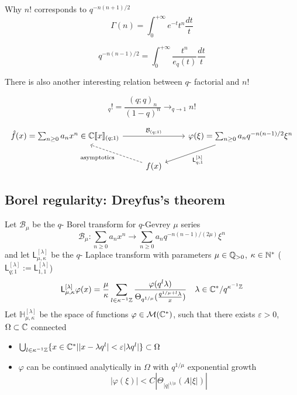 \documentclass[11pt,a4paper,twoside,leqno,noamsfonts]{amsart}
\numberwithin{equation}{section}
\begin{document}
\begin{remark} Why $n!$ corresponds to $q^{-n(n+1)/2}$
\begin{equation}
\Gamma(n)=\int_0^{+\infty}e^{-t}t^n\frac{dt}{t}
\end{equation}

\begin{equation}
q^{-n(n-1)/2}=\int_0^{+\infty}\frac{t^n}{e_q(t)}\frac{dt}{t}
\end{equation}
\end{remark}

There is also another interesting relation between $q$- factorial and $n!$

\begin{equation}
[n]_q!= \frac{(q;q)_n}{(1-q)^n} \rightarrow_{q\to 1} n!
\end{equation}

\[
\begin{tikzcd}
\hat{f}(x)=\sum_{n\geq 0}a_n x^n\in\mathbb{C}[\![x]\!]_{(q;1)} \arrow[rr,"\mathcal{B}_{(q;1)}"] & & \varphi(\xi)=\sum_{n\geq 0}a_n q^{-n(n-1)/2}\xi^n\arrow[dl,"\mathsf{L}^{[\lambda]}_{q;1}"]\\
&f(x)\arrow[lu,dashed ,"\text{asymptotics}"] &
\end{tikzcd}
\]

\subsection{Borel regularity: Dreyfus's theorem}

Let $\mathcal{B}_{\mu}$ be the $q$- Borel transform for $q$-Gevrey $\mu$ series
\begin{equation}
    \mathcal{B}_{\mu}\colon\sum_{n\geq 0}a_nx^n\to \sum_{n\geq 0}a_n q^{-n(n-1)/(2\mu)}\xi^n
\end{equation}
and let $\mathsf{L}_{\mu,\kappa}^{[\lambda]}$ be the $q$- Laplace transform with parameters $\mu\in\mathbb Q_{>0}$, $\kappa\in\mathbb N^*$ ($\mathsf{L}_{q;1}^{[\lambda]}:=\mathsf{L}_{1,1}^{[\lambda]}$)
\begin{equation}
    \mathsf{L}_{\mu,\kappa}^{[\lambda]}\varphi(x)=\frac{\mu}{\kappa}\sum_{l\in \kappa^{-1}\mathbb{Z}}\frac{\varphi(q^l\lambda)}{\Theta_{q^{1/\mu}}(\frac{q^{1/\mu+l}\lambda}{x})}\quad \lambda\in\mathbb C^*/q^{\kappa^{-1}\mathbb Z}
\end{equation}
Let $\mathbb{H}_{\mu,\kappa}^{[\lambda]}$ be the space of functions $\varphi\in\mathcal{M}(\mathbb C^*)$, such that there exists $\varepsilon>0$, $\Omega\subset \mathbb C$ connected 
\begin{itemize}
\item $\bigcup_{l\in\kappa^{-1}\mathbb Z}\lbrace x\in\mathbb C^* | |x-\lambda q^{l}|<\varepsilon |\lambda q^l|\rbrace\subset\Omega$
\item $\varphi$ can be continued analytically in $\Omega$ with $q^{1/\mu}$ exponential growth
\[|\varphi(\xi)|<C|\Theta_{|q|^{1/\mu}}(A|\xi|)|\] 
\end{itemize} 
\end{document}
